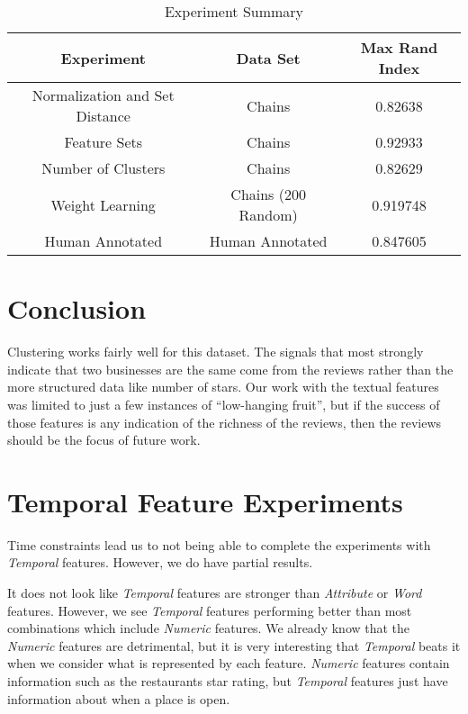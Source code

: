 \documentclass{article}
\begin{document}
   \begin{table}
      \scriptsize
      \begin{center}
         \begin{tabular}{| c | c | c |}
            \hline
               Experiment & Data Set & Max Rand Index \\
            \hline
               Normalization and Set Distance & Chains & 0.82638 \\
               Feature Sets & Chains & 0.92933 \\
               Number of Clusters & Chains & 0.82629 \\
               Weight Learning & Chains (200 Random) & 0.919748 \\
               Human Annotated & Human Annotated & 0.847605 \\
            \hline
         \end{tabular}
         \caption{Experiment Summary}
         \label{tab:experiment-summary}
      \end{center}
   \end{table}


\section{Conclusion}
   Clustering works fairly well for this dataset.
   The signals that most strongly indicate that two businesses are the same come from the reviews rather than the more structured data like number of stars.
   Our work with the textual features was limited to just a few instances of ``low-hanging fruit'',
   but if the success of those features is any indication of the richness of the reviews, then the reviews should be the focus of future work.

\appendix
\appendixpage

\section{Temporal Feature Experiments}
\label{appendix:temporal-features}
   Time constraints lead us to not being able to complete the experiments with \textit{Temporal} features.
   However, we do have partial results.

   It does not look like \textit{Temporal} features are stronger than \textit{Attribute} or \textit{Word} features.
   However, we see \textit{Temporal} features performing better than most combinations which include \textit{Numeric} features.
   We already know that the \textit{Numeric} features are detrimental, but it is very interesting that \textit{Temporal} beats it when we consider what is represented by each feature.
   \textit{Numeric} features contain information such as the restaurants star rating, but \textit{Temporal} features just have information about when a place is open.
\end{document}

